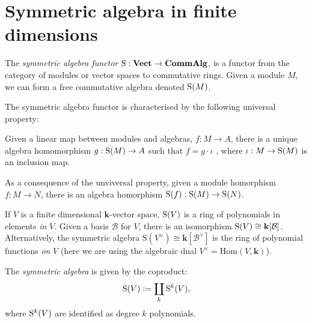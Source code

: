     


    \newpage
    \section{Symmetric algebra in finite dimensions}
    
    
        The \emph{symmetric algebra functor}  \(\mathrm{S} : \textbf{Vect} \rightarrow \textbf{CommAlg}\), is a functor from the category of modules or vector spaces to commutative rings.
    Given a module \(M\), we can form a free commutative algebra denoted \(\mathrm{S}(M)\).

    
    The symmetric algebra functor is characterised by the following universal property:
    
    \begin{defn} 
    Given a linear map between modules and algebras, \(f : M \rightarrow A\), there is a unique algebra homomorphism \(g : \mathrm{S} ( M ) \rightarrow A \) such that \(f = g \cdot \iota\) , where \( \iota : M \rightarrow \mathrm{S}(M) \) is an inclusion map.
    \end{defn}
    
    
    As a consequence of the unviversal property, given a module homorphism \( f : M \rightarrow N\), there is an algebra homorphism \( \mathrm{S}(f) : \mathrm{S}(M) \rightarrow \mathrm{S}(N) \).
    

    If \( V \) is a finite dimensional \( \mathbf{k}\)-vector space, \( \mathrm{S}(V)\) is a ring of polynomials in elements \emph{in} \(V\). Given a basis \( \mathcal{B}\) for \(V\), there is an isomorphism \( \mathrm{S} (V) \cong \mathbf{k}[\mathcal{B}]\). Alternatively, the symmetric algebra \( \mathrm{S}(V^\vee) \cong \mathbf{k}[\mathcal{B}^\vee] \) is the ring of polynomial functions \emph{on} \(V\) (here we are using the algebraic dual \(V^\vee = \mathrm{Hom}(V,\mathbf{k})\)).  
    
    
    \begin{lem} 
    The \emph{symmetric algebra} is given by the coproduct:
    \[ \mathrm{S}(V):= \coprod_k \mathrm{S}^k(V), \]
    where \( \mathrm{S}^k(V)\) are identified as degree \(k\) polynomials. 
    \end{lem}

